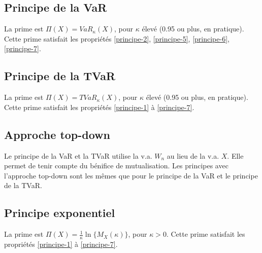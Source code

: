 \subsection{Principe de la VaR}
La prime est $\Pi(X) = VaR_\kappa(X)$, pour $\kappa$ élevé (0.95 ou plus, en pratique). Cette prime satisfait les propriétés \ref{principe-2}, \ref{principe-5}, \ref{principe-6}, \ref{principe-7}.

\subsection{Principe de la TVaR}
La prime est $\Pi(X) = TVaR_\kappa(X)$, pour $\kappa$ élevé (0.95 ou plus, en pratique). Cette prime satisfait les propriétés \ref{principe-1} à \ref{principe-7}.

\subsection{Approche top-down}

Le principe de la VaR et la TVaR utilise la v.a. $W_n$ au lieu de la v.a. $X$. Elle permet de tenir compte du bénifice de mutualisation. Les principes avec l'approche top-down sont les mêmes que pour le principe de la VaR et le principe de la TVaR. 

\subsection{Principe exponentiel}
La prime est $\Pi(X) = \frac{1}{\kappa}\ln\{M_X(\kappa)\}$, pour $\kappa > 0$. Cette prime satisfait les propriétés \ref{principe-1} à \ref{principe-7}.
